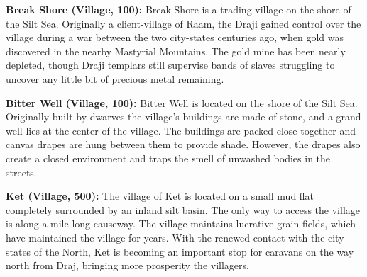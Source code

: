 {
	\textbf{Break Shore (Village, 100):} Break Shore is a trading village on the shore of the Silt Sea. Originally a client-village of Raam, the Draji gained control over the village during a war between the two city-states centuries ago, when gold was discovered in the nearby Mastyrial Mountains. The gold mine has been nearly depleted, though Draji templars still supervise bands of slaves struggling to uncover any little bit of precious metal remaining.

	\textbf{Bitter Well (Village, 100):} Bitter Well is located on the shore of the Silt Sea. Originally built by dwarves the village's buildings are made of stone, and a grand well lies at the center of the village. The buildings are packed close together and canvas drapes are hung between them to provide shade. However, the drapes also create a closed environment and traps the smell of unwashed bodies in the streets.

	\textbf{Ket (Village, 500):} The village of Ket is located on a small mud flat completely surrounded by an inland silt basin. The only way to access the village is along a mile-long causeway. The village maintains lucrative grain fields, which have maintained the village for years. With the renewed contact with the city-states of the North, Ket is becoming an important stop for caravans on the way north from Draj, bringing more prosperity the villagers.
}
